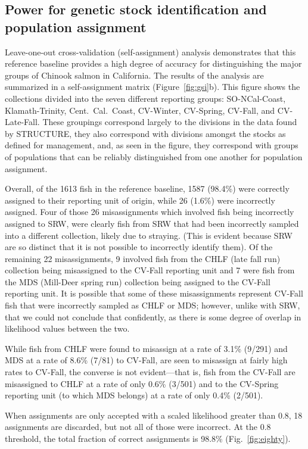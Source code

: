 \subsection*{Power for genetic stock identification and population assignment}

Leave-one-out cross-validation (self-assignment) analysis demonstrates that this
reference baseline provides a high degree of accuracy for distinguishing the major
groups of Chinook salmon in California.  The results of the analysis are summarized
in a self-assignment matrix (Figure~\ref{fig:gsi}b).
This figure shows the collections divided into the seven different reporting groups:
SO-NCal-Coast,  Klamath-Trinity, Cent.\ Cal.\ Coast,
CV-Winter, CV-Spring, CV-Fall, and  CV-Late-Fall.  These groupings correspond
largely to the divisions in the data found by STRUCTURE, they also correspond
with divisions amongst the stocks as defined for management, and, as seen in the
figure, they correspond with groups of populations that can be reliably distinguished
from one another for population assignment.

Overall, of the 1613 fish in the reference baseline, 1587 (98.4\%) were correctly
assigned to their reporting unit of origin, while 26 (1.6\%) were incorrectly assigned.
Four of those 26 misassignments which involved fish being incorrectly assigned to
SRW, were clearly fish from SRW that had been incorrectly sampled into a different
collection, likely due to straying. (This is evident because SRW are so distinct that it is not possible
to incorrectly identify them).  Of the remaining 22 misassignments,  9 involved fish from the
CHLF (late fall run) collection being misassigned to the CV-Fall reporting unit and 7 were
fish from the MDS (Mill-Deer spring run) collection being assigned to the CV-Fall reporting unit.
It is possible that some of these misassignments represent CV-Fall fish that were incorrectly
sampled as CHLF or MDS; however, unlike with SRW, that we could not conclude that
confidently, as there is some degree of overlap in likelihood values between the two.

While fish from CHLF were found to misassign at a rate of 3.1\% (9/291) and MDS at a rate
of 8.6\% (7/81) to CV-Fall, are seen to misassign at fairly high rates to CV-Fall, the
converse is not evident---that is, fish from the CV-Fall are misassigned to CHLF at a rate
of only 0.6\% (3/501) and to the CV-Spring reporting unit (to which MDS belongs) at a rate
of only 0.4\% (2/501).

When assignments are only accepted with a scaled likelihood greater than 0.8,
18 assignments are discarded, but not all of those were incorrect.  At the 0.8 threshold,
the total fraction of correct assignments is 98.8\% (Fig.~\ref{fig:eighty}).

